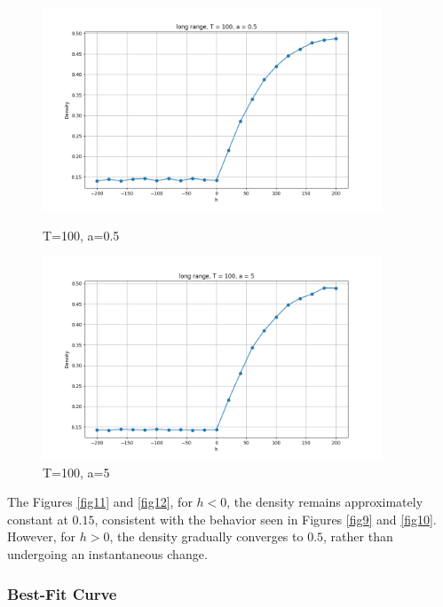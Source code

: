 \documentclass[11pt]{book}
\begin{document}
\begin{figure}
    \centering
    \begin{minipage}{0.45\textwidth}
        \centering
        \includegraphics[width=0.9\textwidth]{long range,T=100,a=0.5.jpg} %
        \caption{T=100, a=0.5}
        \label{fig11}
    \end{minipage}\hfill
    \begin{minipage}{0.45\textwidth}
        \centering
        \includegraphics[width=0.9\textwidth]{long-range T=100, a=5.jpg} %
        \caption{T=100, a=5}
        \label{fig12}
    \end{minipage}
\end{figure}

The Figures \eqref{fig11} and \eqref{fig12}, for $h < 0$, the density remains approximately constant at $0.15$, consistent with the behavior seen in Figures \eqref{fig9} and \eqref{fig10}. However, for $h > 0$, the density gradually converges to $0.5$, rather than undergoing an instantaneous change.

\subsubsection{Best-Fit Curve}
\end{document}
